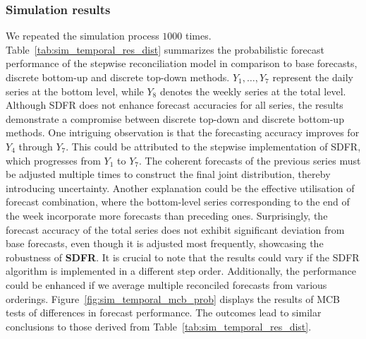 \documentclass[a4paper,review,12pt,authoryear]{elsarticle}
\begin{document}
     \subsubsection{Simulation results}
     We repeated the simulation process $1000$ times.
     Table~\ref{tab:sim_temporal_res_dist} summarizes the probabilistic forecast performance of the stepwise reconciliation model in comparison to base forecasts, discrete bottom-up and discrete top-down methods.
     $Y_1,\dots,Y_7$ represent the daily series at the bottom level, while $Y_8$ denotes the weekly series at the total level.
     Although SDFR does not enhance forecast accuracies for all series, the results
     demonstrate a compromise between discrete top-down and discrete bottom-up methods. 
     One intriguing observation is that the forecasting accuracy improves for $Y_4$ through $Y_7$. 
     This could be attributed to the stepwise implementation of SDFR, which progresses from $Y_1$ to $Y_7$. The coherent forecasts of the previous series must be adjusted multiple times to construct the final joint distribution, thereby introducing uncertainty.
     Another explanation could be the effective utilisation of forecast combination, where the bottom-level series corresponding to the end of the week incorporate more forecasts than preceding ones.
     Surprisingly, the forecast accuracy of the total series does not exhibit significant deviation from base forecasts,  even though it is adjusted most frequently, showcasing the robustness of \textbf{SDFR}.
     It is crucial to note that the results could vary if the SDFR algorithm is implemented in a different step order.
     Additionally, the performance could be enhanced if we average multiple reconciled forecasts from various orderings.
     Figure~\ref{fig:sim_temporal_mcb_prob} displays the results of MCB tests of differences in forecast performance. The outcomes lead to similar conclusions to those derived from Table~\ref{tab:sim_temporal_res_dist}. 
     
\end{document}
